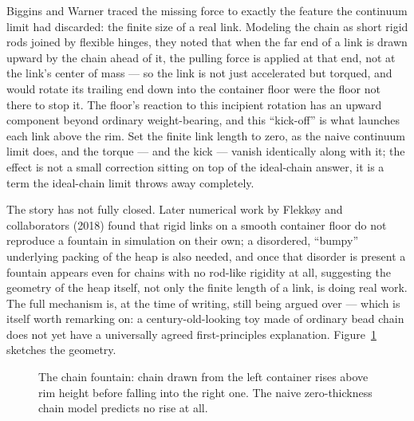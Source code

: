 \documentclass[11pt]{book}
\begin{document}
Biggins and Warner traced the missing force to exactly the feature the continuum limit had discarded: the finite size of a real link. Modeling the chain as short rigid rods joined by flexible hinges, they noted that when the far end of a link is drawn upward by the chain ahead of it, the pulling force is applied at that end, not at the link's center of mass --- so the link is not just accelerated but torqued, and would rotate its trailing end down into the container floor were the floor not there to stop it. The floor's reaction to this incipient rotation has an upward component beyond ordinary weight-bearing, and this ``kick-off'' is what launches each link above the rim. Set the finite link length to zero, as the naive continuum limit does, and the torque --- and the kick --- vanish identically along with it; the effect is not a small correction sitting on top of the ideal-chain answer, it is a term the ideal-chain limit throws away completely.

The story has not fully closed. Later numerical work by Flekk{\o}y and collaborators (2018) found that rigid links on a smooth container floor do not reproduce a fountain in simulation on their own; a disordered, ``bumpy'' underlying packing of the heap is also needed, and once that disorder is present a fountain appears even for chains with no rod-like rigidity at all, suggesting the geometry of the heap itself, not only the finite length of a link, is doing real work. The full mechanism is, at the time of writing, still being argued over --- which is itself worth remarking on: a century-old-looking toy made of ordinary bead chain does not yet have a universally agreed first-principles explanation. Figure~\ref{fig:fountain} sketches the geometry.

\begin{figure}[h]
\centering
{}
\caption{The chain fountain: chain drawn from the left container rises above rim height before falling into the right one. The naive zero-thickness chain model predicts no rise at all.}
\label{fig:fountain}
\end{figure}
\end{document}

